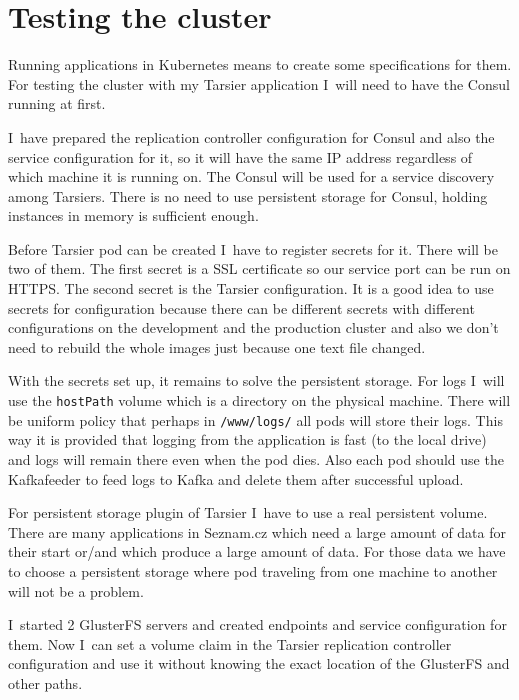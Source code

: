 \chapter{Testing the cluster}

Running applications in Kubernetes means to create some specifications for them. For testing the cluster with my Tarsier application I~will need to have the Consul running at first.

I~have prepared the replication controller configuration for Consul and also the service configuration for it, so it will have the same IP address regardless of which machine it is running on. The Consul will be used for a service discovery among Tarsiers. There is no need to use persistent storage for Consul, holding instances in memory is sufficient enough.

Before Tarsier pod can be created I~have to register secrets for it. There will be two of them. The first secret is a SSL certificate so our service port can be run on HTTPS. The second secret is the Tarsier configuration. It is a good idea to use secrets for configuration because there can be different secrets with different configurations on the development and the production cluster and also we don’t need to rebuild the whole images just because one text file changed.

With the secrets set up, it remains to solve the persistent storage. For logs I~will use the \lstinline{hostPath} volume which is a directory on the physical machine. There will be uniform policy that perhaps in \lstinline{/www/logs/} all pods will store their logs. This way it is provided that logging from the application is fast (to the local drive) and logs will remain there even when the pod dies. Also each pod should use the Kafkafeeder to feed logs to Kafka and delete them after successful upload.
 
For persistent storage plugin of Tarsier I~have to use a real persistent volume. There are many applications in Seznam.cz which need a large amount of data for their start or/and which produce a large amount of data. For those data we have to choose a persistent storage where pod traveling from one machine to another will not be a problem.

I~started 2 GlusterFS \cite{glusterfs} servers and created endpoints and service configuration for them. Now I~can set a volume claim in the Tarsier replication controller configuration and use it without knowing the exact location of the GlusterFS and other paths.

